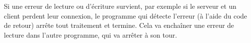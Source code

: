 \documentclass[letterpaper,12pt]{scrartcl}
\begin{document}
Si une erreur de lecture ou d'écriture survient, par exemple si le serveur et un client perdent leur connexion, le programme qui détecte l'erreur (à l'aide du code de retour) arrête tout traitement et termine. Cela va enchaîner une erreur de lecture dans l'autre programme, qui va arrêter à son tour.
\end{document}

